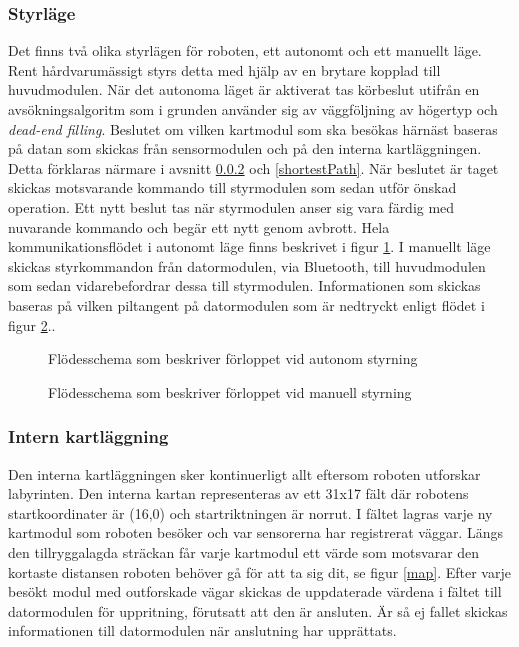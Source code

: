 \documentclass[11pt]{article}
\begin{document}
\begin{flushleft}
\subsubsection{Styrläge}
Det finns två olika styrlägen för roboten, ett autonomt och ett manuellt läge. Rent hårdvarumässigt styrs detta med hjälp av en brytare kopplad till huvudmodulen. När det autonoma läget är aktiverat tas körbeslut utifrån en avsökningsalgoritm som i grunden använder sig av väggföljning av högertyp och \emph{dead-end filling}. Beslutet om vilken kartmodul som ska besökas härnäst baseras på datan som skickas från sensormodulen och på den interna kartläggningen. Detta förklaras närmare i avsnitt \ref{search} och \ref{shortestPath}. När beslutet är taget skickas motsvarande kommando till styrmodulen som sedan utför önskad operation. Ett nytt beslut tas när styrmodulen anser sig vara färdig med nuvarande kommando och begär ett nytt genom avbrott. Hela kommunikationsflödet i autonomt läge finns beskrivet i figur \ref{autonomousMode}. I manuellt läge skickas styrkommandon från datormodulen, via Bluetooth\textsuperscript{\circledR}, till huvudmodulen som sedan vidarebefordrar dessa till styrmodulen. Informationen som skickas baseras på vilken piltangent på datormodulen som är nedtryckt enligt flödet i figur \ref{manualMode}..

\begin{figure}[htbp]
\centering
\noindent\resizebox{0.9\linewidth}{!}{
	}
	\cprotect\caption{Flödesschema som beskriver förloppet vid autonom styrning \label{autonomousMode}}	
\end{figure}

\begin{figure}[htbp]
\centering
\noindent\resizebox{0.9\linewidth}{!}{
	}
	\cprotect\caption{Flödesschema som beskriver förloppet vid manuell styrning \label{manualMode}}	
\end{figure}

\subsubsection{Intern kartläggning} \label{search}
Den interna kartläggningen sker kontinuerligt allt eftersom roboten utforskar labyrinten. Den interna kartan representeras av ett 31x17 fält där robotens startkoordinater är (16,0) och startriktningen är norrut. I fältet lagras varje ny kartmodul som roboten besöker och var sensorerna har registrerat väggar. Längs den tillryggalagda sträckan får varje kartmodul ett värde som motsvarar den kortaste distansen roboten behöver gå för att ta sig dit, se figur \ref{map}. Efter varje besökt modul med outforskade vägar skickas de uppdaterade värdena i fältet till datormodulen för uppritning, förutsatt att den är ansluten. Är så ej fallet skickas informationen till datormodulen när anslutning har upprättats. 


\end{flushleft}
\end{document}
